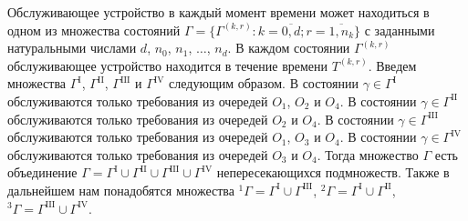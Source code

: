 Обслуживающее устройство в каждый момент времени может находиться в одном из множества состояний $\Gamma=\{\Gamma^{(k, r)} \colon k=\overline{0, d}; r=\overline{1, n_k}\}$ с заданными натуральными числами $d$,  $n_0$,  $n_1$,  $\ldots$,  $n_d$. В каждом состоянии $\Gamma^{(k, r)}$ обслуживающее устройство находится в течение времени $T^{(k, r)}$. Введем множества $\Gamma^{\mathrm{I}}$,  $\Gamma^{\mathrm{II}}$, 
$\Gamma^{\mathrm{III}}$ и $\Gamma^{\mathrm{IV}}$ следующим образом. В состоянии $\gamma \in \Gamma^{\mathrm{I}}$ обслуживаются только требования из очередей $O_1$,  $O_2$ и $O_4$.
В состоянии $\gamma \in \Gamma^{\mathrm{II}}$ обслуживаются только требования из очередей $O_2$ и $O_4$.
В состоянии $\gamma \in \Gamma^{\mathrm{III}}$ обслуживаются только требования из очередей $O_1$,  $O_3$ и $O_4$.
В состоянии $\gamma \in \Gamma^{\mathrm{IV}}$ обслуживаются только требования из очередей $O_3$ и $O_4$.
Тогда множество $\Gamma$ есть объединение $\Gamma = \Gamma^{\mathrm{I}} \cup \Gamma^{\mathrm{II}} \cup \Gamma^{\mathrm{III}} \cup\Gamma^{\mathrm{IV}}$ непересекающихся подмножеств. Также в дальнейшем нам понадобятся множества ${}^1\Gamma=\Gamma^{\mathrm{I}} \cup \Gamma^{\mathrm{III}}$,  
${}^2\Gamma=\Gamma^{\mathrm{I}} \cup \Gamma^{\mathrm{II}}$, 
${}^3\Gamma=\Gamma^{\mathrm{III}} \cup \Gamma^{\mathrm{IV}}$. 


